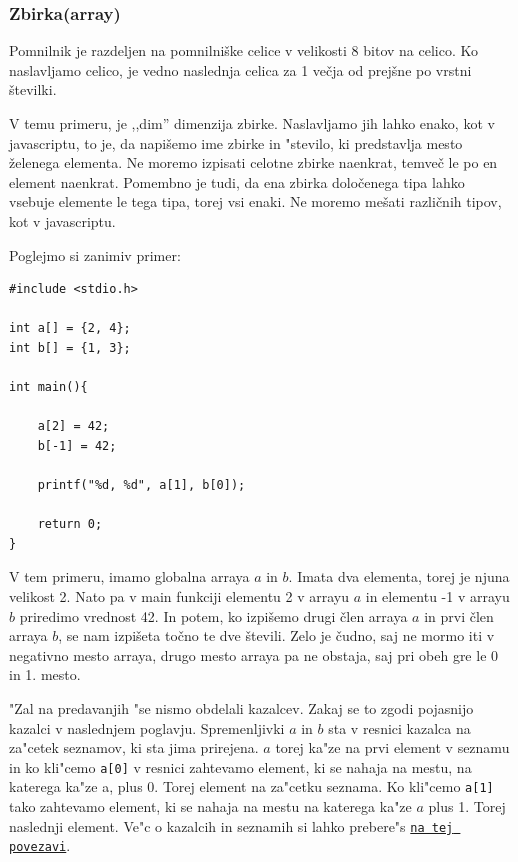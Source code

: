 \documentclass[a4paper, 12pt]{article}
\begin{document}
\subsubsection{Zbirka(array)}
Pomnilnik je razdeljen na pomnilniške celice v velikosti 8 bitov na celico. Ko naslavljamo celico, je vedno naslednja celica za 1 večja od prejšne po vrstni številki. \

\begin{center}
\end{center}

V temu primeru, je ,,dim'' dimenzija zbirke. Naslavljamo jih lahko enako, kot v javascriptu, to je, da napišemo ime zbirke in "stevilo, ki predstavlja mesto želenega elementa. Ne moremo izpisati celotne zbirke naenkrat, temveč le po en element naenkrat. Pomembno je tudi, da ena zbirka določenega tipa lahko vsebuje elemente le tega tipa, torej vsi enaki. Ne moremo mešati različnih tipov, kot v javascriptu.

Poglejmo si zanimiv primer:

\begin{lstlisting}
#include <stdio.h>

int a[] = {2, 4};
int b[] = {1, 3};

int main(){

	a[2] = 42;
	b[-1] = 42;

	printf("%d, %d", a[1], b[0]);

	return 0;
}
\end{lstlisting}

V tem primeru, imamo globalna arraya $a$ in $b$. Imata dva elementa, torej je njuna velikost 2. Nato pa v main funkciji elementu 2 v arrayu $a$ in elementu -1 v arrayu $b$ priredimo vrednost 42. In potem, ko izpišemo drugi člen arraya $a$ in prvi člen arraya $b$, se nam izpišeta točno te dve števili. Zelo je čudno, saj ne mormo iti v negativno mesto arraya, drugo mesto arraya pa ne obstaja, saj pri obeh gre le 0 in 1. mesto.

"Zal na predavanjih "se nismo obdelali kazalcev. Zakaj se to zgodi pojasnijo kazalci v naslednjem poglavju. Spremenljivki $a$ in $b$ sta v resnici kazalca na za"cetek seznamov, ki sta jima prirejena. $a$ torej ka"ze na prvi element v seznamu in ko kli"cemo \lstinline|a[0]| v resnici zahtevamo element, ki se nahaja na mestu, na katerega ka"ze a, plus 0. Torej element na za"cetku seznama. Ko kli"cemo \lstinline|a[1]| tako zahtevamo element, ki se nahaja na mestu na katerega ka"ze $a$ plus 1. Torej naslednji element. Ve"c o kazalcih in seznamih si lahko prebere"s  \href{https://github.com/DzinVision/c-uvod}{\texttt{na tej povezavi}}.
\end{document}
